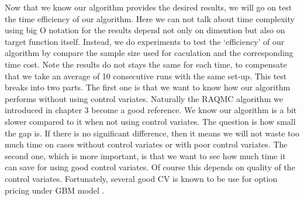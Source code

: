 
Now that we know our algorithm provides the desired results, we will go on test the time efficiency of our algorithm. 
Here we can not talk about time complexity using big O notation for the results depend not only on dimention but also on target function itself. 
Instead, we do experiments to test the `efficiency' of our algorithm by compare the sample size used for caculation and the corresponding time cost. 
Note the results do not stays the same for each time, to compensate that we take an average of 10 consecutive runs with the same set-up. 
This test breaks into two parts. 
The first one is that we want to know how our algorithm performs without using control variates. 
Naturally the RAQMC algorithm we introduced in chapter 3 become a good reference. 
We know our algorithm is a bit slower compared to it when not using control variates. The question is how small the gap is. 
If there is no significant difference, then it means we will not waste too much time on cases without control variates or with poor control variates. 
The second one, which is more important, is that we want to see how much time it can save for using good control variates. Of course this depends on quality of the control variates. Fortunately, several good CV is known to be use for option pricing under GBM model \cite{lidebrandt2007variance}.         

